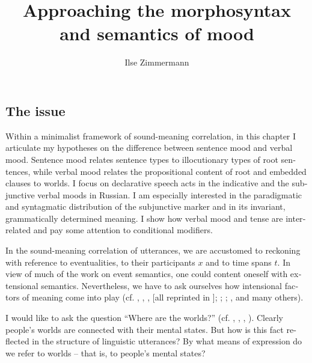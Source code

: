 \documentclass[output=paper,colorlinks,citecolor=brown]{langscibook}
\author{Ilse Zimmermann\affiliation{Centre for General Linguistics (ZAS), Berlin}}
\title{Approaching the morphosyntax and semantics of mood}
\begin{document}
\begin{otherlanguage}{english}
\maketitle


\section{The issue}

Within a minimalist framework of sound-meaning correlation, in this chapter I articulate my hypotheses on the difference between sentence mood and verbal mood. Sentence mood relates sentence types to illocutionary types of root sentences, while verbal mood relates the propositional content of root and embedded clauses to worlds. I focus on declarative speech acts in the indicative and the subjunctive verbal moods in Russian. I am especially interested in the paradigmatic and syntagmatic distribution of the subjunctive marker and in its invariant, grammatically determined meaning. I show how verbal mood and tense are interrelated and pay some attention to conditional modifiers.

In the sound-meaning correlation of utterances, we are accustomed to reckoning with reference to eventualities, to their participants $x$ and to time spans $t$. In view of much of the work on event semantics, one could content oneself with extensional semantics. Nevertheless, we have to ask ourselves how intensional factors of meaning come into play (cf. \citeauthor{Montague1970a} \citeyear{Montague1970a}, \citeyear{Montague1970b}, \citeyear{Montague1970c}, \citeyear{Montague1973} [all reprinted in \citealt{Thomason1974}]; \citealt{Heim-Kratzer1998}; \citealt{Fintel-Heim2011}; \citealt{Stechow2012}, and many others).

I would like to ask the question ``Where are the worlds?'' (cf. \citeauthor{Zimmermann2017} \citeyear{Zimmermann2010}, \citeyear{Zimmermann2013}, \citeyear{Zimmermann2015a}, \citeyear{Zimmermann2017}). Clearly people’s worlds are connected with their mental states. But how is this fact reflected in the structure of linguistic utterances? By what means of expression do we refer to worlds -- that is, to people’s mental states?


\end{otherlanguage}
\end{document}
